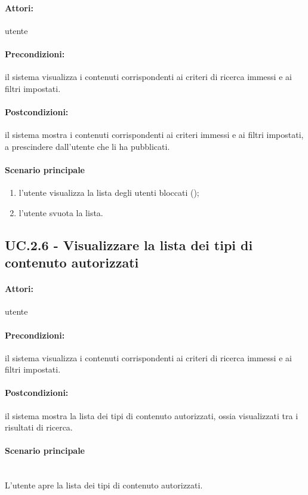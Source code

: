 \documentclass[10pt,a4paper,headinclude,footinclude,hidelinks]{scrreprt} %
\begin{document}
	\paragraph{Attori:} utente
	\paragraph{Precondizioni:} il sistema visualizza i contenuti corrispondenti ai criteri di ricerca immessi e ai filtri impostati.
	\paragraph{Postcondizioni:} il sistema mostra i contenuti corrispondenti ai criteri immessi e ai filtri impostati, a prescindere dall'utente che li ha pubblicati.
	\paragraph{Scenario principale}
	\begin{enumerate}
	\item l'utente visualizza la lista degli utenti bloccati ();
	\item l'utente svuota la lista.
	\end{enumerate}

	\subsection[UC.2.6]{UC.2.6 - Visualizzare la lista dei tipi di contenuto autorizzati}
	\label{ch:stage:ar:uc:2_6}
	\paragraph{Attori:} utente
	\paragraph{Precondizioni:} il sistema visualizza i contenuti corrispondenti ai criteri di ricerca immessi e ai filtri impostati.
	\paragraph{Postcondizioni:} il sistema mostra la lista dei tipi di contenuto autorizzati, ossia visualizzati tra i risultati di ricerca.
	\paragraph{Scenario principale} \hfill \\
	L'utente apre la lista dei tipi di contenuto autorizzati.
\end{document}
